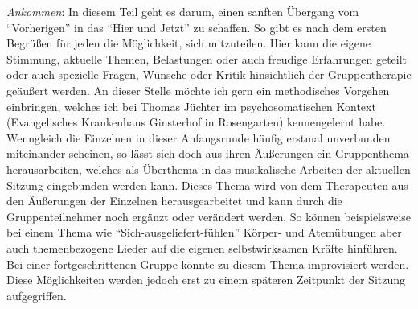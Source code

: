 \emph{Ankommen}:
In diesem Teil geht es darum, einen sanften Übergang vom "`Vorherigen"' in das "`Hier und Jetzt"' zu schaffen. So gibt es nach dem ersten Begrüßen für jeden die Möglichkeit, sich mitzuteilen. Hier kann die eigene Stimmung, aktuelle Themen, Belastungen oder auch freudige Erfahrungen geteilt oder auch spezielle Fragen, Wünsche oder Kritik hinsichtlich der Gruppentherapie geäußert werden. An dieser Stelle möchte ich gern ein methodisches Vorgehen einbringen, welches ich bei Thomas Jüchter im psychosomatischen Kontext (Evangelisches Krankenhaus Ginsterhof in Rosengarten) kennengelernt habe. Wenngleich die Einzelnen in dieser Anfangsrunde häufig erstmal unverbunden miteinander scheinen, so lässt sich doch aus ihren Äußerungen ein Gruppenthema herausarbeiten, welches als Überthema in das musikalische Arbeiten der aktuellen Sitzung eingebunden werden kann. Dieses Thema wird von dem Therapeuten aus den Äußerungen der Einzelnen herausgearbeitet und kann durch die Gruppenteilnehmer noch ergänzt oder verändert werden. So können beispielsweise bei einem Thema wie "`Sich-ausgeliefert-fühlen"' Körper- und Atemübungen aber auch themenbezogene Lieder auf die eigenen selbstwirksamen Kräfte hinführen. Bei einer fortgeschrittenen Gruppe könnte zu diesem Thema improvisiert werden. Diese Möglichkeiten werden jedoch erst zu einem späteren Zeitpunkt der Sitzung aufgegriffen. 

